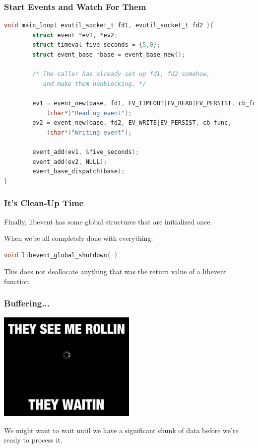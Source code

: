 \begin{frame}[fragile]
	\frametitle{Start Events and Watch For Them}
	\begin{lstlisting}[language=C]
void main_loop( evutil_socket_t fd1, evutil_socket_t fd2 ){
        struct event *ev1, *ev2;
        struct timeval five_seconds = {5,0};
        struct event_base *base = event_base_new();

        /* The caller has already set up fd1, fd2 somehow, 
           and make them nonblocking. */

        ev1 = event_new(base, fd1, EV_TIMEOUT|EV_READ|EV_PERSIST, cb_func,
            (char*)"Reading event");
        ev2 = event_new(base, fd2, EV_WRITE|EV_PERSIST, cb_func, 
            (char*)"Writing event");

        event_add(ev1, &five_seconds);
        event_add(ev2, NULL);
        event_base_dispatch(base);
}
\end{lstlisting}

\end{frame}


\begin{frame}[fragile]
	\frametitle{It's Clean-Up Time}

	Finally, libevent has some global structures that are initialized once.

	When we're all completely done with everything:

	\begin{lstlisting}[language=C]
void libevent_global_shutdown( )
\end{lstlisting}

	This does not deallocate anything that was the return value of a libevent function.

\end{frame}



\begin{frame}
	\frametitle{Buffering...}

	\begin{center}
		\includegraphics[width=0.5\textwidth]{images/buffering.jpeg}
	\end{center}


	We might want to wait until we have a significant chunk of data before we're ready to process it.

\end{frame}



